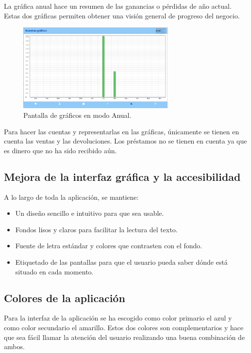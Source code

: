 La gráfica anual hace un resumen de las ganancias o pérdidas de año actual. Estas dos gráficas permiten obtener una visión general de progreso del negocio. 

\begin{figure}[H]
	\centering
	\includegraphics[width=0.7\textwidth]{imagenes/TerceraIteracion/graficosAnual.png}
	\caption{Pantalla de gráficos en modo Anual.}
	\label{fig:anual}
\end{figure}

Para hacer las cuentas y representarlas en las gráficas, únicamente se tienen en cuenta las ventas y las devoluciones. Los préstamos no se tienen en cuenta ya que es dinero que no ha sido recibido aún. 



\subsection{Mejora de la interfaz gráfica y la accesibilidad}

A lo largo de toda la aplicación, se mantiene: 

\begin{itemize}
	\item Un diseño sencillo e intuitivo para que sea usable.
	\item Fondos lisos y claros para facilitar la lectura del texto. 
	\item Fuente de letra estándar y colores que contrasten con el fondo.  
	\item Etiquetado de las pantallas para que el usuario pueda saber dónde está situado en cada momento. 
\end{itemize}

\subsection{Colores de la aplicación}

Para la interfaz de la aplicación se ha escogido como color primario el azul y como color secundario el amarillo. Estos dos colores son complementarios y hace que sea fácil llamar la atención del usuario realizando una buena combinación de ambos. 

